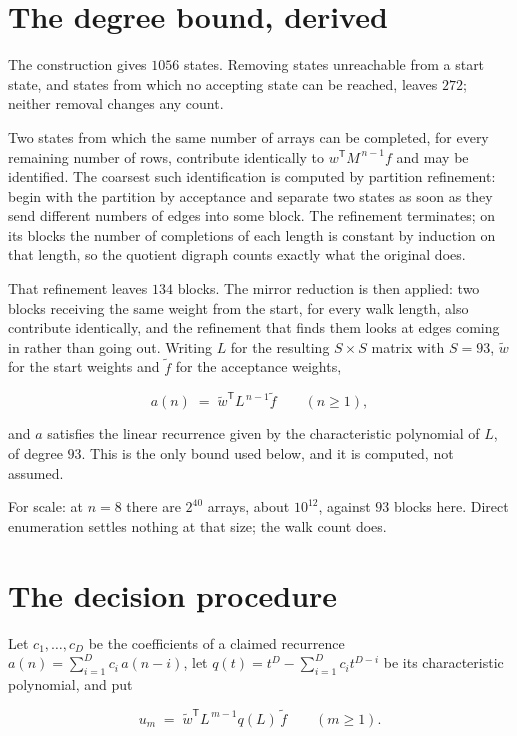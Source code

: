 \documentclass[11pt]{article}
\theoremstyle{definition}
\begin{document}
\section{The degree bound, derived}

The construction gives $1056$ states. Removing states unreachable from a start state, and states from which no accepting state can be reached, leaves $272$; neither removal changes any count.

Two states from which the same number of arrays can be completed, for every remaining number of rows, contribute identically to $w^{\mathsf T}M^{\,n-1}f$ and may be identified. The coarsest such identification is computed by partition refinement: begin with the partition by acceptance and separate two states as soon as they send different numbers of edges into some block. The refinement terminates; on its blocks the number of completions of each length is constant by induction on that length, so the quotient digraph counts exactly what the original does.

That refinement leaves $134$ blocks. The mirror reduction is then applied: two blocks receiving the same weight from the start, for every walk length, also contribute identically, and the refinement that finds them looks at edges coming in rather than going out. Writing $L$ for the resulting $S \times S$ matrix with $S = 93$, $\tilde w$ for the start weights and $\tilde f$ for the acceptance weights,

\[a(n) \;=\; \tilde w^{\mathsf T} L^{\,n-1} \tilde f \qquad (n \ge 1),\]

and $a$ satisfies the linear recurrence given by the characteristic polynomial of $L$, of degree $93$. This is the only bound used below, and it is computed, not assumed.

For scale: at $n = 8$ there are $2^{40}$ arrays, about $10^{12}$, against $93$ blocks here. Direct enumeration settles nothing at that size; the walk count does.

\section{The decision procedure}

Let $c_1,\dots,c_D$ be the coefficients of a claimed recurrence $a(n) = \sum_{i=1}^{D} c_i\,a(n-i)$, let $q(t) = t^{D} - \sum_{i=1}^{D} c_i t^{D-i}$ be its characteristic polynomial, and put

\[u_m \;=\; \tilde w^{\mathsf T} L^{\,m-1} q(L)\,\tilde f \qquad (m \ge 1).\]
\end{document}
